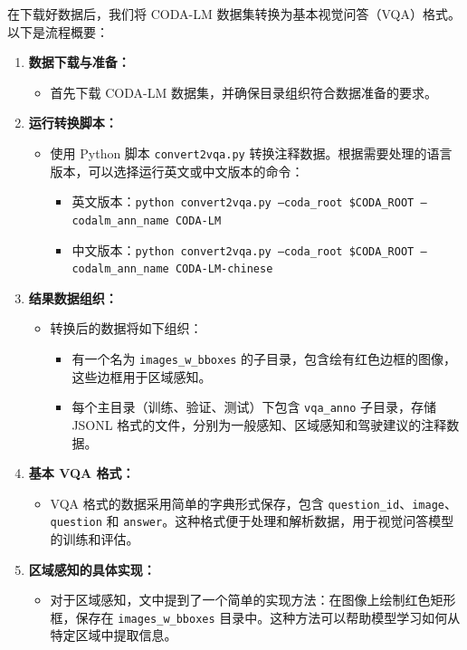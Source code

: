 \documentclass[
    linespread = 1.25
]{ctexart}
\begin{document}
在下载好数据后，我们将 CODA-LM 数据集转换为基本视觉问答（VQA）格式。以下是流程概要：

\begin{enumerate}
  \item \textbf{数据下载与准备：}
        \begin{itemize}
          \item 首先下载 CODA-LM 数据集，并确保目录组织符合数据准备的要求。
        \end{itemize}

  \item \textbf{运行转换脚本：}
        \begin{itemize}
          \item 使用 Python 脚本 \texttt{convert2vqa.py} 转换注释数据。根据需要处理的语言版本，可以选择运行英文或中文版本的命令：
                \begin{itemize}
                  \item 英文版本：\texttt{python convert2vqa.py --coda\_root \$CODA\_ROOT --codalm\_ann\_name CODA-LM}
                  \item 中文版本：\texttt{python convert2vqa.py --coda\_root \$CODA\_ROOT --codalm\_ann\_name CODA-LM-chinese}
                \end{itemize}
        \end{itemize}

  \item \textbf{结果数据组织：}
        \begin{itemize}
          \item 转换后的数据将如下组织：
                \begin{itemize}
                  \item 有一个名为 \texttt{images\_w\_bboxes} 的子目录，包含绘有红色边框的图像，这些边框用于区域感知。
                  \item 每个主目录（训练、验证、测试）下包含 \texttt{vqa\_anno} 子目录，存储 JSONL 格式的文件，分别为一般感知、区域感知和驾驶建议的注释数据。
                \end{itemize}
        \end{itemize}

  \item \textbf{基本 VQA 格式：}
        \begin{itemize}
          \item VQA 格式的数据采用简单的字典形式保存，包含 \texttt{question\_id}、\texttt{image}、\texttt{question} 和 \texttt{answer}。这种格式便于处理和解析数据，用于视觉问答模型的训练和评估。
        \end{itemize}

  \item \textbf{区域感知的具体实现：}
        \begin{itemize}
          \item 对于区域感知，文中提到了一个简单的实现方法：在图像上绘制红色矩形框，保存在 \texttt{images\_w\_bboxes} 目录中。这种方法可以帮助模型学习如何从特定区域中提取信息。
        \end{itemize}
\end{enumerate}
\end{document}

